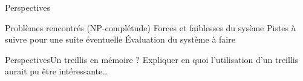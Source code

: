 \begin{frame}{Perspectives}



Problèmes rencontrés (NP-complétude)
Forces et faiblesses du sysème
Pistes à suivre pour une suite éventuelle
Évaluation du système à faire
\end{frame}

\begin{frame}{Perspectives}{Un treillis en mémoire ?}
Expliquer en quoi l'utilisation d'un treillis aurait pu être intéressante\ldots
\end{frame}